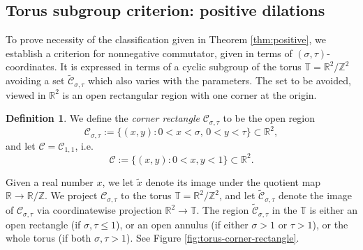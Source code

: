 \documentclass[11pt, letterpaper, reqno]{amsart}
\theoremstyle{definition}
\newtheorem{defi}[thm]{Definition}
\numberwithin{equation}{section}
\newcommand{\RR}{\ensuremath{\mathbb{R}}}
\newcommand{\ZZ}{\ensuremath{\mathbb{Z}}}
\newcommand{\TT}{\mathbb{T}}
\newcommand{\cC}{\mathcal{C}}
\newcommand{\cCbar}{\widetilde{\mathcal{C}}}
\newcommand{\talpha}{{\sigma}}
\newcommand{\trho}{{\tau}}
\begin{document}
{%
%
%
\subsection{Torus subgroup criterion: positive dilations}

To prove necessity of the classification given in Theorem \ref{thm:positive}, 
 we establish a criterion for nonnegative commutator, given in
terms of  $(\talpha, \trho)$-coordinates.
 It is expressed in terms of 
a cyclic subgroup of the torus $\TT = \RR^2/\ZZ^2$ avoiding a set $\cCbar_{\talpha, \trho}$
which also varies with the parameters. 
The set to be avoided, viewed in $\RR^2$  
is an open rectangular region  with one corner at the origin. 

\begin{defi}\label{defn:corner-rectangle}
We define the {\em corner rectangle} 
$\cC_{\talpha,\trho}$ to be the  open  region
\begin{equation}
\cC_{\talpha,\trho} := \{(x,y) : 0<x<\talpha, \, 0<y<\trho \} \subset \RR^2,
\end{equation}
and let $\cC = \cC_{1,1}$, i.e.
\begin{equation}
\cC := {\{ (x,y) : 0 < x,y < 1\}} \subset \RR^2.
\end{equation}
\end{defi}

Given a real number $x$, we let $\widetilde{x}$ denote its image
 under the quotient map $\RR \to \RR/\ZZ$.
We project $\cC_{\talpha,\trho}$ to  
the torus $\TT= \RR^2/\ZZ^2$,
and let $\cCbar_{\talpha,\trho}$ denote  the image of $\cC_{\talpha,\trho}$
via coordinatewise projection  $\RR^2 \to \TT$.
 The region  $\cCbar_{\talpha,\trho}$ in the $\TT$ is either an open rectangle 
(if $\talpha,\trho\leq 1$), or an open annulus (if either $\talpha>1$ or $\trho>1$), or the whole torus (if both $\talpha,\trho>1$).
See Figure \ref{fig:torus-corner-rectangle}.


\begin{figure}[h]
\begin{center}
\end{center}
\end{figure}}
\end{document}
